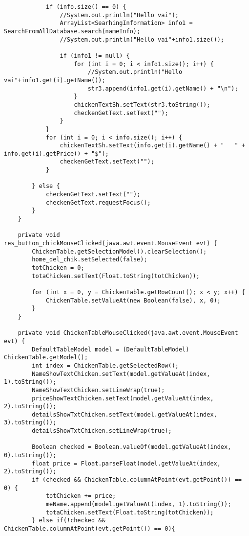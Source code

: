 \documentclass[12pt,a4paper]{article}
\begin{document}
\begin{lstlisting}
            if (info.size() == 0) {
                //System.out.println("Hello vai");
                ArrayList<SearhingInformation> info1 = SearchFromAllDatabase.search(nameInfo);
                //System.out.println("Hello vai"+info1.size());

                if (info1 != null) {
                    for (int i = 0; i < info1.size(); i++) {
                        //System.out.println("Hello vai"+info1.get(i).getName());
                        str3.append(info1.get(i).getName() + "\n");
                    }
                    chickenTextSh.setText(str3.toString());
                    checkenGetText.setText("");
                }
            }
            for (int i = 0; i < info.size(); i++) {
                chickenTextSh.setText(info.get(i).getName() + "   " + info.get(i).getPrice() + "$");
                checkenGetText.setText("");
            }

        } else {
            checkenGetText.setText("");
            checkenGetText.requestFocus();
        }
    }                                                

    private void res_button_chickMouseClicked(java.awt.event.MouseEvent evt) {                                              
        ChickenTable.getSelectionModel().clearSelection();
        home_del_chik.setSelected(false);
        totChicken = 0;
        totaChicken.setText(Float.toString(totChicken));

        for (int x = 0, y = ChickenTable.getRowCount(); x < y; x++) {
            ChickenTable.setValueAt(new Boolean(false), x, 0);
        }
    }                                             

    private void ChickenTableMouseClicked(java.awt.event.MouseEvent evt) {                                          
        DefaultTableModel model = (DefaultTableModel) ChickenTable.getModel();
        int index = ChickenTable.getSelectedRow();
        NameShowTextChicken.setText(model.getValueAt(index, 1).toString());
        NameShowTextChicken.setLineWrap(true);
        priceShowTextChicken.setText(model.getValueAt(index, 2).toString());
        detailsShowTxtChicken.setText(model.getValueAt(index, 3).toString());
        detailsShowTxtChicken.setLineWrap(true);

        Boolean checked = Boolean.valueOf(model.getValueAt(index, 0).toString());
        float price = Float.parseFloat(model.getValueAt(index, 2).toString());
        if (checked && ChickenTable.columnAtPoint(evt.getPoint()) == 0) {
            totChicken += price;
            meName.append(model.getValueAt(index, 1).toString());
            totaChicken.setText(Float.toString(totChicken));
        } else if(!checked && ChickenTable.columnAtPoint(evt.getPoint()) == 0){
            

\end{lstlisting}
\end{document}
